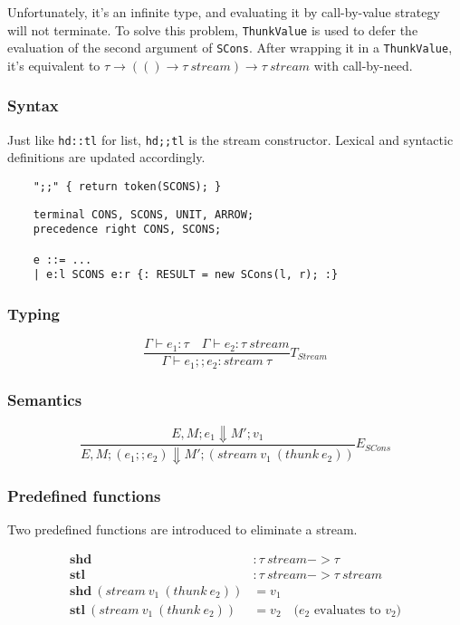 \documentclass[a4paper]{article}
\begin{document}
Unfortunately, it's an infinite type, and evaluating it by call-by-value strategy will not terminate.
To solve this problem, \texttt{ThunkValue} is used to defer the evaluation of the second argument of \texttt{SCons}.
After wrapping it in a \texttt{ThunkValue}, it's equivalent to $\tau \to (() \to \tau\ stream) \to \tau\ stream$ with call-by-need.

\subsubsection{Syntax}

Just like \texttt{hd::tl} for list, \texttt{hd;;tl} is the stream constructor.
Lexical and syntactic definitions are updated accordingly.

\begin{Verbatim}
    ";;" { return token(SCONS); }
\end{Verbatim}

\begin{Verbatim}
    terminal CONS, SCONS, UNIT, ARROW;
    precedence right CONS, SCONS;

    e ::= ...
    | e:l SCONS e:r {: RESULT = new SCons(l, r); :}
\end{Verbatim}

\subsubsection{Typing}
\[
    \frac{\Gamma \vdash e_1: \tau \quad \Gamma \vdash e_2: \tau\ stream}{\Gamma \vdash e_1;;e_2: stream\ \tau}T_{Stream}
\]

\subsubsection{Semantics}

\[
    \frac{E,M;e_1 \Downarrow M'; v_1}{E,M;(e_1;;e_2) \Downarrow M'; (stream\ v_1\ (thunk\ e_2))}E_{SCons}
\]

\subsubsection{Predefined functions}

Two predefined functions are introduced to eliminate a stream.

\begin{align*}
    \textbf{shd}                              & : \tau\ stream -> \tau                        \\
    \textbf{stl}                              & : \tau\ stream -> \tau\ stream                \\
    \textbf{shd}\ (stream\ v_1\ (thunk\ e_2)) & = v_1                                         \\
    \textbf{stl}\ (stream\ v_1\ (thunk\ e_2)) & = v_2 \quad \text{($e_2$ evaluates to $v_2$)} \\
\end{align*}
\end{document}
